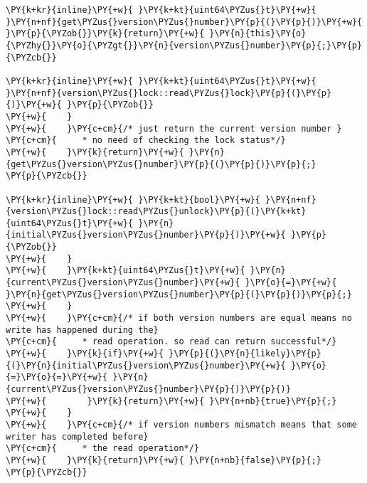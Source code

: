 \begin{Verbatim}[commandchars=\\\{\},codes={\catcode`\$=3\catcode`\^=7\catcode`\_=8\relax}]
\PY{k+kr}{inline}\PY{+w}{ }\PY{k+kt}{uint64\PYZus{}t}\PY{+w}{ }\PY{n+nf}{get\PYZus{}version\PYZus{}number}\PY{p}{(}\PY{p}{)}\PY{+w}{ }\PY{p}{\PYZob{}}\PY{k}{return}\PY{+w}{ }\PY{n}{this}\PY{o}{\PYZhy{}}\PY{o}{\PYZgt{}}\PY{n}{version\PYZus{}number}\PY{p}{;}\PY{p}{\PYZcb{}}

\PY{k+kr}{inline}\PY{+w}{ }\PY{k+kt}{uint64\PYZus{}t}\PY{+w}{ }\PY{n+nf}{version\PYZus{}lock::read\PYZus{}lock}\PY{p}{(}\PY{p}{)}\PY{+w}{ }\PY{p}{\PYZob{}}
\PY{+w}{    }
\PY{+w}{    }\PY{c+cm}{/* just return the current version number }
\PY{c+cm}{     * no need of checking the lock status*/}
\PY{+w}{    }\PY{k}{return}\PY{+w}{ }\PY{n}{get\PYZus{}version\PYZus{}number}\PY{p}{(}\PY{p}{)}\PY{p}{;}
\PY{p}{\PYZcb{}}

\PY{k+kr}{inline}\PY{+w}{ }\PY{k+kt}{bool}\PY{+w}{ }\PY{n+nf}{version\PYZus{}lock::read\PYZus{}unlock}\PY{p}{(}\PY{k+kt}{uint64\PYZus{}t}\PY{+w}{ }\PY{n}{initial\PYZus{}version\PYZus{}number}\PY{p}{)}\PY{+w}{ }\PY{p}{\PYZob{}}
\PY{+w}{    }
\PY{+w}{    }\PY{k+kt}{uint64\PYZus{}t}\PY{+w}{ }\PY{n}{current\PYZus{}version\PYZus{}number}\PY{+w}{ }\PY{o}{=}\PY{+w}{ }\PY{n}{get\PYZus{}version\PYZus{}number}\PY{p}{(}\PY{p}{)}\PY{p}{;}
\PY{+w}{    }
\PY{+w}{    }\PY{c+cm}{/* if both version numbers are equal means no write has happened during the}
\PY{c+cm}{     * read operation. so read can return successful*/}
\PY{+w}{    }\PY{k}{if}\PY{+w}{ }\PY{p}{(}\PY{n}{likely}\PY{p}{(}\PY{n}{initial\PYZus{}version\PYZus{}number}\PY{+w}{ }\PY{o}{=}\PY{o}{=}\PY{+w}{ }\PY{n}{current\PYZus{}version\PYZus{}number}\PY{p}{)}\PY{p}{)}
\PY{+w}{        }\PY{k}{return}\PY{+w}{ }\PY{n+nb}{true}\PY{p}{;}
\PY{+w}{    }
\PY{+w}{    }\PY{c+cm}{/* if version numbers mismatch means that some writer has completed before}
\PY{c+cm}{     * the read operation*/}
\PY{+w}{    }\PY{k}{return}\PY{+w}{ }\PY{n+nb}{false}\PY{p}{;}
\PY{p}{\PYZcb{}}
\end{Verbatim}
